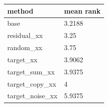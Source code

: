 \begin{tabular}{ll}
\toprule
method & mean rank \\
\midrule
base & 3.2188 \\
residual\_xx & 3.25 \\
random\_xx & 3.75 \\
target\_xx & 3.9062 \\
target\_sum\_xx & 3.9375 \\
target\_copy\_xx & 4 \\
target\_noise\_xx & 5.9375 \\
\bottomrule
\end{tabular}
